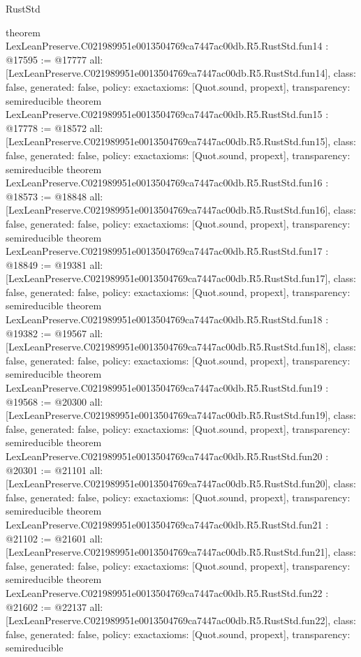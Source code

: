 \begin{lexlean}{RustStd}
\begin{coremodule}
{}
theorem LexLeanPreserve.C021989951e0013504769ca7447ac00db.R5.RustStd.fun14 : @17595 := @17777 {
  all: [LexLeanPreserve.C021989951e0013504769ca7447ac00db.R5.RustStd.fun14],
  class: false,
  generated: false,
  policy: exact{axioms: [Quot.sound, propext]},
  transparency: semireducible
}
theorem LexLeanPreserve.C021989951e0013504769ca7447ac00db.R5.RustStd.fun15 : @17778 := @18572 {
  all: [LexLeanPreserve.C021989951e0013504769ca7447ac00db.R5.RustStd.fun15],
  class: false,
  generated: false,
  policy: exact{axioms: [Quot.sound, propext]},
  transparency: semireducible
}
theorem LexLeanPreserve.C021989951e0013504769ca7447ac00db.R5.RustStd.fun16 : @18573 := @18848 {
  all: [LexLeanPreserve.C021989951e0013504769ca7447ac00db.R5.RustStd.fun16],
  class: false,
  generated: false,
  policy: exact{axioms: [Quot.sound, propext]},
  transparency: semireducible
}
theorem LexLeanPreserve.C021989951e0013504769ca7447ac00db.R5.RustStd.fun17 : @18849 := @19381 {
  all: [LexLeanPreserve.C021989951e0013504769ca7447ac00db.R5.RustStd.fun17],
  class: false,
  generated: false,
  policy: exact{axioms: [Quot.sound, propext]},
  transparency: semireducible
}
theorem LexLeanPreserve.C021989951e0013504769ca7447ac00db.R5.RustStd.fun18 : @19382 := @19567 {
  all: [LexLeanPreserve.C021989951e0013504769ca7447ac00db.R5.RustStd.fun18],
  class: false,
  generated: false,
  policy: exact{axioms: [Quot.sound, propext]},
  transparency: semireducible
}
theorem LexLeanPreserve.C021989951e0013504769ca7447ac00db.R5.RustStd.fun19 : @19568 := @20300 {
  all: [LexLeanPreserve.C021989951e0013504769ca7447ac00db.R5.RustStd.fun19],
  class: false,
  generated: false,
  policy: exact{axioms: [Quot.sound, propext]},
  transparency: semireducible
}
theorem LexLeanPreserve.C021989951e0013504769ca7447ac00db.R5.RustStd.fun20 : @20301 := @21101 {
  all: [LexLeanPreserve.C021989951e0013504769ca7447ac00db.R5.RustStd.fun20],
  class: false,
  generated: false,
  policy: exact{axioms: [Quot.sound, propext]},
  transparency: semireducible
}
theorem LexLeanPreserve.C021989951e0013504769ca7447ac00db.R5.RustStd.fun21 : @21102 := @21601 {
  all: [LexLeanPreserve.C021989951e0013504769ca7447ac00db.R5.RustStd.fun21],
  class: false,
  generated: false,
  policy: exact{axioms: [Quot.sound, propext]},
  transparency: semireducible
}
theorem LexLeanPreserve.C021989951e0013504769ca7447ac00db.R5.RustStd.fun22 : @21602 := @22137 {
  all: [LexLeanPreserve.C021989951e0013504769ca7447ac00db.R5.RustStd.fun22],
  class: false,
  generated: false,
  policy: exact{axioms: [Quot.sound, propext]},
  transparency: semireducible
}
\end{coremodule}
\end{lexlean}
